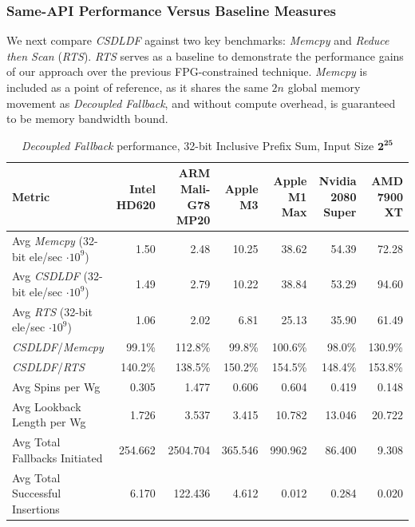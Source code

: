 \documentclass[sigconf]{acmart}
\begin{document}
\subsubsection{Same-API Performance Versus Baseline Measures}
We next compare \emph{CSDLDF} against two key benchmarks: \emph{Memcpy}\textdagger{~\ref{sec:memcpy}} and \emph{Reduce then Scan}\textdagger{~\ref{sec:rts}} (\emph{RTS}). \emph{RTS} serves as a baseline to demonstrate the performance gains of our approach over the previous FPG-constrained technique. \emph{Memcpy} is included as a point of reference, as it shares the same $2n$ global memory movement as \emph{Decoupled Fallback}, and without compute overhead, is guaranteed to be memory bandwidth bound.

\begin{table}
  \centering
  \begin{tabular*}{\textwidth}{@{\extracolsep{\fill}} l r r r r r r}
    \toprule
    Metric & Intel HD620 & ARM Mali-G78 MP20 & Apple M3 & Apple M1 Max & Nvidia 2080 Super & AMD 7900 XT \\
    \midrule
    Avg \emph{Memcpy} (32-bit ele/sec $\cdot 10^9$)  & 1.50   & 2.48  & 10.25  & 38.62  & 54.39  & 72.28  \\
    Avg \emph{CSDLDF} (32-bit ele/sec $\cdot 10^9$)   & 1.49   & 2.79  & 10.22  & 38.84  & 53.29  & 94.60  \\
    Avg \emph{RTS} (32-bit ele/sec $\cdot 10^9$)      & 1.06   & 2.02  & 6.81   & 25.13  & 35.90  & 61.49  \\
    \emph{CSDLDF}/\emph{Memcpy}       & 99.1\%    & 112.8\%  & 99.8\%    & 100.6\%   & 98.0\%    & 130.9\%   \\
    \emph{CSDLDF}/\emph{RTS}          & 140.2\%   & 138.5\%  & 150.2\%   & 154.5\%   & 148.4\%   & 153.8\%   \\
    Avg Spins per Wg    & 0.305    & 1.477    & 0.606    & 0.604    & 0.419    & 0.148    \\
    Avg Lookback Length per Wg  & 1.726    & 3.537    & 3.415    & 10.782   & 13.046   & 20.722   \\
    Avg Total Fallbacks Initiated      & 254.662   & 2504.704  & 365.546   & 990.962   & 86.400   & 9.308   \\
    Avg Total Successful Insertions    & 6.170     & 122.436   & 4.612     & 0.012    & 0.284    & 0.020    \\
    \bottomrule
  \end{tabular*}
  \caption{\emph{Decoupled Fallback} performance, 32-bit Inclusive Prefix Sum, Input Size $\mathbf{2^{25}}$}
  \label{tab:results}
\end{table}
\end{document}
